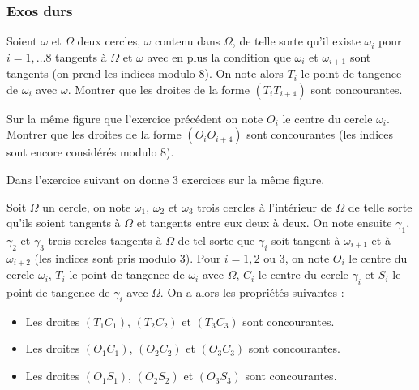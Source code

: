 \subsubsection{Exos durs}

\begin{exo}

Soient $\omega$ et $\Omega$ deux cercles, $\omega$ contenu dans $\Omega$, de telle sorte qu'il existe $\omega_i$ pour $i=1,\ldots 8$ tangents à $\Omega$ et $\omega$ avec en plus la condition que $\omega_i$ et $\omega_{i+1}$ sont tangents (on prend les indices modulo 8). On note alors $T_i$ le point de tangence de $\omega_i$ avec $\omega$. Montrer que les droites de la forme $(T_iT_{i+4})$ sont concourantes.
\end{exo}

\begin{exo}

Sur la même figure que l'exercice précédent on note $O_i$ le centre du cercle $\omega_i$. Montrer que les droites de la forme $(O_iO_{i+4})$ sont concourantes (les indices sont encore considérés modulo 8).
\end{exo}

Dans l'exercice suivant on donne 3 exercices sur la même figure.

\begin{exo}

Soit $\Omega$ un cercle, on note $\omega_1$, $\omega_2$ et $\omega_3$ trois cercles à l'intérieur de $\Omega$ de telle sorte qu'ils soient tangents à $\Omega$ et tangents entre eux deux à deux. On note ensuite $\gamma_1$, $\gamma_2$ et $\gamma_3$ trois cercles tangents à $\Omega$ de tel sorte que $\gamma_i$ soit tangent à $\omega_{i+1}$ et à $\omega_{i+2}$ (les indices sont pris modulo 3). Pour $i=1,2$ ou $3$, on note $O_i$ le centre du cercle $\omega_i$, $T_i$ le point de tangence de $\omega_i$ avec $\Omega$, $C_i$ le centre du cercle $\gamma_i$ et $S_i$ le point de tangence de $\gamma_i$ avec $\Omega$. On a alors les propriétés suivantes :

\begin{itemize}
\item Les droites $(T_1C_1)$, $(T_2C_2)$ et $(T_3C_3)$ sont concourantes.
\item Les droites $(O_1C_1)$, $(O_2C_2)$ et $(O_3C_3)$ sont concourantes.
\item Les droites $(O_1S_1)$, $(O_2S_2)$ et $(O_3S_3)$ sont concourantes.
\end{itemize}
\end{exo}




